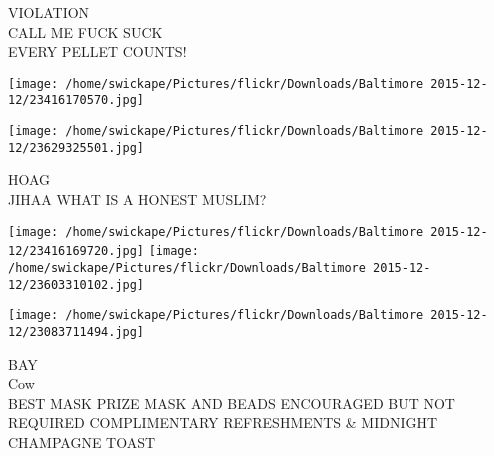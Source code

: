 \documentclass[10pt,letterpaper]{article}
\begin{document}
VIOLATION\\
CALL ME FUCK SUCK\\
EVERY PELLET COUNTS!
\pagebreak

\texttt{[image: /home/swickape/Pictures/flickr/Downloads/Baltimore 2015-12-12/23416170570.jpg]}

\vspace{0.25in}
\texttt{[image: /home/swickape/Pictures/flickr/Downloads/Baltimore 2015-12-12/23629325501.jpg]}

HOAG\\
JIHAA WHAT IS A HONEST MUSLIM?
\pagebreak

\texttt{[image: /home/swickape/Pictures/flickr/Downloads/Baltimore 2015-12-12/23416169720.jpg]}
\texttt{[image: /home/swickape/Pictures/flickr/Downloads/Baltimore 2015-12-12/23603310102.jpg]}

\texttt{[image: /home/swickape/Pictures/flickr/Downloads/Baltimore 2015-12-12/23083711494.jpg]}

BAY\\
Cow\\
BEST MASK PRIZE MASK AND BEADS ENCOURAGED BUT NOT REQUIRED COMPLIMENTARY REFRESHMENTS \& MIDNIGHT CHAMPAGNE TOAST
\pagebreak
\end{document}
